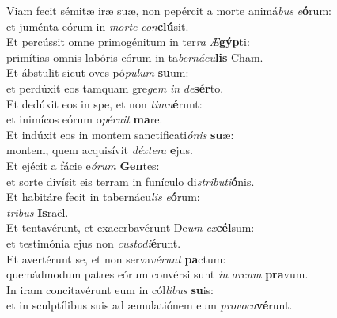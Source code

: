 \oddverse Viam fecit sémitæ iræ suæ, non pepércit a morte animá\textit{bus} \textit{e}\textbf{ó}rum:~\*\\
\oddverse et juménta eórum in \textit{mor}\textit{te} \textit{con}\textbf{clú}sit.\\
\evenverse Et percússit omne primogénitum in ter\textit{ra} \textit{Æ}\textbf{gýp}ti:~\*\\
\evenverse primítias omnis labóris eórum in ta\textit{ber}\textit{ná}\textit{cu}\textbf{lis} Cham.\\
\oddverse Et ábstulit sicut oves pó\textit{pu}\textit{lum} \textbf{su}um:~\*\\
\oddverse et perdúxit eos tamquam gre\textit{gem} \textit{in} \textit{de}\textbf{sér}to.\\
\evenverse Et dedúxit eos in spe, et non \textit{ti}\textit{mu}\textbf{é}runt:~\*\\
\evenverse et inimícos eórum o\textit{pé}\textit{ru}\textit{it} \textbf{ma}re.\\
\oddverse Et indúxit eos in montem sanctificati\textit{ó}\textit{nis} \textbf{su}æ:~\*\\
\oddverse montem, quem acquisívit \textit{déx}\textit{te}\textit{ra} \textbf{e}jus.\\
\evenverse Et ejécit a fácie e\textit{ó}\textit{rum} \textbf{Gen}tes:~\*\\
\evenverse et sorte divísit eis terram in funículo di\textit{stri}\textit{bu}\textit{ti}\textbf{ó}nis.\\
\oddverse Et habitáre fecit in tabernácu\textit{lis} \textit{e}\textbf{ó}rum:~\*\\
\oddverse \textit{tri}\textit{bus} \textbf{Is}raël.\\
\evenverse Et tentavérunt, et exacerbavérunt De\textit{um} \textit{ex}\textbf{cél}sum:~\*\\
\evenverse et testimónia ejus non \textit{cu}\textit{sto}\textit{di}\textbf{é}runt.\\
\oddverse Et avertérunt se, et non serva\textit{vé}\textit{runt} \textbf{pa}ctum:~\*\\
\oddverse quemádmodum patres eórum convérsi sunt \textit{in} \textit{ar}\textit{cum} \textbf{pra}vum.\\
\evenverse In iram concitavérunt eum in cól\textit{li}\textit{bus} \textbf{su}is:~\*\\
\evenverse et in sculptílibus suis ad æmulatiónem eum \textit{pro}\textit{vo}\textit{ca}\textbf{vé}runt.\\
